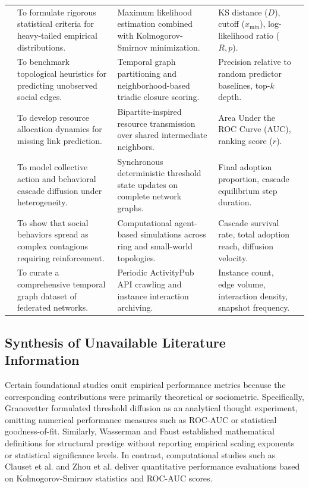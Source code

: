 \documentclass[conference]{IEEEtran}
\begin{document}
\begin{table}[t]
{\begin{tabular}{cllll}
\cite{clauset2009power} & To formulate rigorous statistical criteria for heavy-tailed empirical distributions. & Maximum likelihood estimation combined with Kolmogorov-Smirnov minimization. & KS distance ($D$), cutoff ($x_{\min}$), log-likelihood ratio ($R, p$). \\
\cite{liben2007link} & To benchmark topological heuristics for predicting unobserved social edges. & Temporal graph partitioning and neighborhood-based triadic closure scoring. & Precision relative to random predictor baselines, top-$k$ depth. \\
\cite{zhou2009predicting} & To develop resource allocation dynamics for missing link prediction. & Bipartite-inspired resource transmission over shared intermediate neighbors. & Area Under the ROC Curve (AUC), ranking score ($r$). \\
\cite{granovetter1978threshold} & To model collective action and behavioral cascade diffusion under heterogeneity. & Synchronous deterministic threshold state updates on complete network graphs. & Final adoption proportion, cascade equilibrium step duration. \\
\cite{centola2007complex} & To show that social behaviors spread as complex contagions requiring reinforcement. & Computational agent-based simulations across ring and small-world topologies. & Cascade survival rate, total adoption reach, diffusion velocity. \\
\cite{damie2026fedivertex} & To curate a comprehensive temporal graph dataset of federated networks. & Periodic ActivityPub API crawling and instance interaction archiving. & Instance count, edge volume, interaction density, snapshot frequency. \\
\bottomrule
\end{tabular}%
}
\end{table}

\subsection{Synthesis of Unavailable Literature Information}
Certain foundational studies omit empirical performance metrics because the corresponding contributions were primarily theoretical or sociometric. Specifically, Granovetter \cite{granovetter1978threshold} formulated threshold diffusion as an analytical thought experiment, omitting numerical performance measures such as ROC-AUC or statistical goodness-of-fit. Similarly, Wasserman and Faust \cite{wasserman1994social} established mathematical definitions for structural prestige without reporting empirical scaling exponents or statistical significance levels. In contrast, computational studies such as Clauset et al. \cite{clauset2009power} and Zhou et al. \cite{zhou2009predicting} deliver quantitative performance evaluations based on Kolmogorov-Smirnov statistics and ROC-AUC scores.
\end{document}
